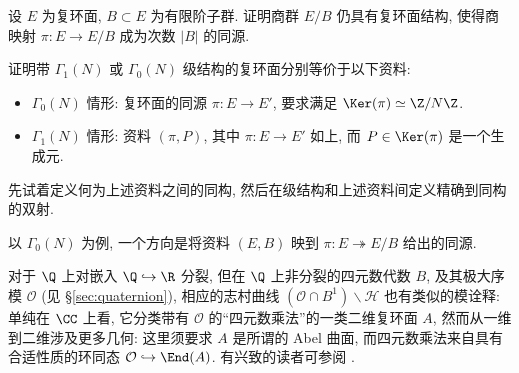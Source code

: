 \begin{exercise}
	设 $E$ 为复环面, $B \subset E$ 为有限阶子群. 证明商群 $E/B$ 仍具有复环面结构, 使得商映射 $\pi: E \to E/B$ 成为次数 $|B|$ 的同源.
\end{exercise}

\begin{exercise} 
	证明带 $\Gamma_1(N)$ 或 $\Gamma_0(N)$ 级结构的复环面分别等价于以下资料:
	\begin{itemize}
		\item $\Gamma_0(N)$ 情形: 复环面的同源 $\pi: E \to E'$, 要求满足 $\Ker(\pi) \simeq \Z/N\Z$.
		\item $\Gamma_1(N)$ 情形: 资料 $(\pi, P)$, 其中 $\pi: E \to E'$ 如上, 而 $P \in \Ker(\pi)$ 是一个生成元.
	\end{itemize}
	先试着定义何为上述资料之间的同构, 然后在级结构和上述资料间定义精确到同构的双射.
	
	\begin{hint}
		以 $\Gamma_0(N)$ 为例, 一个方向是将资料 $(E, B)$ 映到 $\pi: E \twoheadrightarrow E/B$ 给出的同源.
	\end{hint}
\end{exercise}

\begin{remark}
	对于 $\Q$ 上对嵌入 $\Q \hookrightarrow \R$ 分裂, 但在 $\Q$ 上非分裂的四元数代数 $B$, 及其极大序模 $\mathcal{O}$ (见 \S\ref{sec:quaternion}), 相应的志村曲线 $(\mathcal{O} \cap B^1) \backslash \mathcal{H}$ 也有类似的模诠释: 单纯在 $\CC$ 上看, 它分类带有 $\mathcal{O}$ 的``四元数乘法''的一类二维复环面 $A$, 然而从一维到二维涉及更多几何: 这里须要求 $A$ 是所谓的 Abel 曲面, 而四元数乘法来自具有合适性质的环同态 $\mathcal{O} \hookrightarrow \End(A)$. 有兴致的读者可参阅 \cite[\S 43]{Voi}.
\end{remark}
